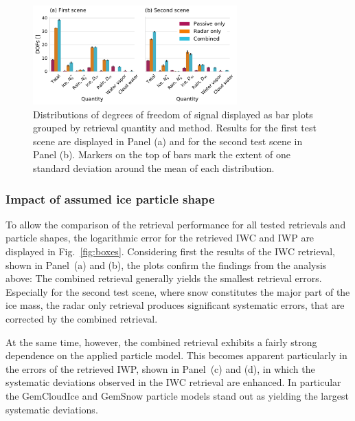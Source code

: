 \documentclass[journal abbreviation, manuscript]{copernicus}
\begin{document}
\begin{figure}
\centering
\includegraphics[width = 0.7\textwidth]{../plots/dofs}
\caption{Distributions of degrees of freedom of signal displayed as bar
  plots grouped by retrieval quantity and method. Results for the first test scene are
  displayed in  Panel (a) and for the second test scene in Panel (b).
  Markers on the top of bars mark the extent of one standard deviation around
  the mean of each distribution.}
\label{fig:dofs}
\end{figure}

\subsubsection{Impact of assumed ice particle shape}

To allow the comparison of the retrieval performance for all tested retrievals
and particle shapes, the logarithmic error for the retrieved IWC and IWP are
displayed in Fig.~\ref{fig:boxes}. Considering first the results of the IWC
retrieval, shown in Panel~(a) and (b), the plots confirm the findings from the
analysis above: The combined retrieval generally yields the smallest retrieval
errors. Especially for the second test scene, where snow constitutes the major
part of the ice mass, the radar only retrieval produces significant systematic
errors, that are corrected by the combined retrieval.

At the same time, however, the combined retrieval exhibits a fairly strong
dependence on the applied particle model. This becomes apparent particularly in
the errors of the retrieved IWP, shown in Panel~(c) and (d), in which the
systematic deviations observed in the IWC retrieval are enhanced. In particular
the GemCloudIce and GemSnow particle models stand out as yielding the largest
systematic deviations.
\end{document}
